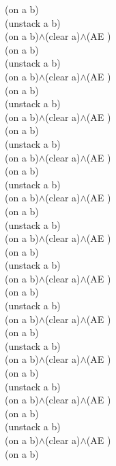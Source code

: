 {{(on a b)\\
(unstack a b)\\
(on a b)$\wedge$(clear a)$\wedge$(AE )\\
(on a b)\\
(unstack a b)\\
(on a b)$\wedge$(clear a)$\wedge$(AE )\\
(on a b)\\
(unstack a b)\\
(on a b)$\wedge$(clear a)$\wedge$(AE )\\
(on a b)\\
(unstack a b)\\
(on a b)$\wedge$(clear a)$\wedge$(AE )\\
(on a b)\\
(unstack a b)\\
(on a b)$\wedge$(clear a)$\wedge$(AE )\\
(on a b)\\
(unstack a b)\\
(on a b)$\wedge$(clear a)$\wedge$(AE )\\
(on a b)\\
(unstack a b)\\
(on a b)$\wedge$(clear a)$\wedge$(AE )\\
(on a b)\\
(unstack a b)\\
(on a b)$\wedge$(clear a)$\wedge$(AE )\\
(on a b)\\
(unstack a b)\\
(on a b)$\wedge$(clear a)$\wedge$(AE )\\
(on a b)\\
(unstack a b)\\
(on a b)$\wedge$(clear a)$\wedge$(AE )\\
(on a b)\\
(unstack a b)\\
(on a b)$\wedge$(clear a)$\wedge$(AE )\\
(on a b)\\
}%
}

